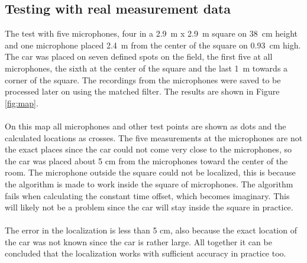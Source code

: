 \documentclass[final]{scrreprt} %
\begin{document}
\subsection{Testing with real measurement data}
The test with five microphones, four in a \SI{2.9}{\metre} x \SI{2.9}{\metre} square on \SI{38}{\centi\metre} height and one microphone placed \SI{2.4}{\metre} from the center of the square on \SI{0.93}{\centi\metre} high.
The car was placed on seven defined spots on the field, the first five at all microphones, the sixth at the center of the square and the last \SI{1}{\metre} towards a corner of the square.
The recordings from the microphones were saved to be processed later on using the matched filter.
The results are shown in Figure \ref{fig:map}.
\\ \\
On this map all microphones and other test points are shown as dots and the calculated locations as crosses.
The five measurements at the microphones are not the exact places since the car could not come very close to the microphones, so the car was placed about 5 cm from the microphones toward the center of the room.
The microphone outside the square could not be localized, this is because the algorithm is made to work inside the square of microphones.
The algorithm fails when calculating the constant time offset, which becomes imaginary.
This will likely not be a problem since the car will stay inside the square in practice.
\\ \\
The error in the localization is less than 5 cm, also because the exact location of the car was not known since the car is rather large.
All together it can be concluded that the localization works with sufficient accuracy in practice too.
\end{document}
